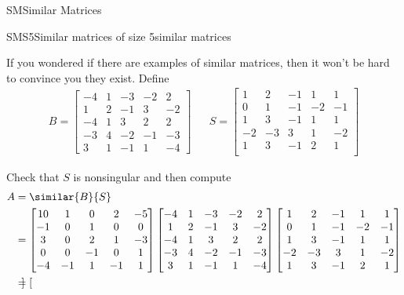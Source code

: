 \begin{subsect}{SM}{Similar Matrices}
\begin{example}{SMS5}{Similar matrices of size 5}{similar matrices}
\begin{para}If you wondered if there are examples of similar matrices, then it won't be hard to convince you they exist.  Define
%
\begin{align*}
B=\begin{bmatrix}
-4 & 1 & -3 & -2 & 2 \\
1 & 2 & -1 & 3 & -2 \\
-4 & 1 & 3 & 2 & 2 \\
-3 & 4 & -2 & -1 & -3 \\
3 & 1 & -1 & 1 & -4
\end{bmatrix}
&&
S=\begin{bmatrix}
1 & 2 & -1 & 1 & 1 \\
0 & 1 & -1 & -2 & -1 \\
1 & 3 & -1 & 1 & 1 \\
-2 & -3 & 3 & 1 & -2 \\
1 & 3 & -1 & 2 & 1\\
\end{bmatrix}
\end{align*}
\end{para}
%
\begin{para}Check that $S$ is nonsingular and then compute
%
\begin{align*}
A&=\similar{B}{S}\\
&=
\begin{bmatrix}
10 & 1 & 0 & 2 & -5 \\
-1 & 0 & 1 & 0 & 0 \\
3 & 0 & 2 & 1 & -3 \\
0 & 0 & -1 & 0 & 1 \\
-4 & -1 & 1 & -1 & 1
\end{bmatrix}
\begin{bmatrix}
-4 & 1 & -3 & -2 & 2 \\
1 & 2 & -1 & 3 & -2 \\
-4 & 1 & 3 & 2 & 2 \\
-3 & 4 & -2 & -1 & -3 \\
3 & 1 & -1 & 1 & -4
\end{bmatrix}
\begin{bmatrix}
1 & 2 & -1 & 1 & 1 \\
0 & 1 & -1 & -2 & -1 \\
1 & 3 & -1 & 1 & 1 \\
-2 & -3 & 3 & 1 & -2 \\
1 & 3 & -1 & 2 & 1
\end{bmatrix}\\
&=
\begin{bmatrix}

\end{bmatrix}
\end{align*}
\end{para}
\end{example}
\end{subsect}
